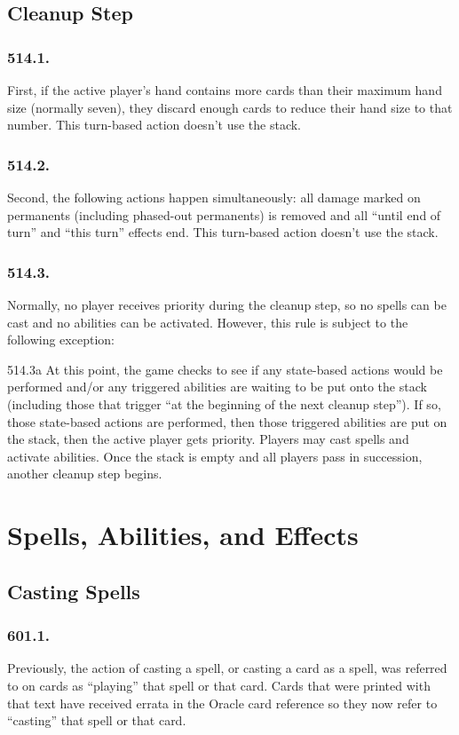 \section{Cleanup Step}
\subsection*{514.1.}
First, if the active player’s hand contains more cards than their maximum hand size (normally seven), they discard enough cards to reduce their hand size to that number. This turn-based action doesn’t use the stack.

\subsection*{514.2.}
Second, the following actions happen simultaneously: all damage marked on permanents (including phased-out permanents) is removed and all “until end of turn” and “this turn” effects end. This turn-based action doesn’t use the stack.

\subsection*{514.3.}
Normally, no player receives priority during the cleanup step, so no spells can be cast and no abilities can be activated. However, this rule is subject to the following exception:

514.3a At this point, the game checks to see if any state-based actions would be performed and/or any triggered abilities are waiting to be put onto the stack (including those that trigger “at the beginning of the next cleanup step”). If so, those state-based actions are performed, then those triggered abilities are put on the stack, then the active player gets priority. Players may cast spells and activate abilities. Once the stack is empty and all players pass in succession, another cleanup step begins.

\chapter{Spells, Abilities, and Effects}
\setcounter{section}{599}
\section{Casting Spells}
\subsection*{601.1.}
Previously, the action of casting a spell, or casting a card as a spell, was referred to on cards as “playing” that spell or that card. Cards that were printed with that text have received errata in the Oracle card reference so they now refer to “casting” that spell or that card.

